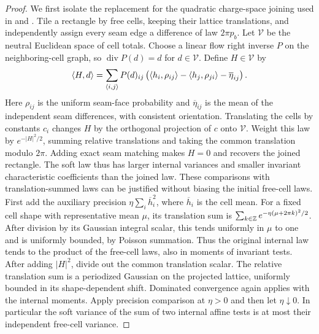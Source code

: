 \begin{proof}
We first isolate the replacement for the quadratic charge-space
joining used in  and
. Tile a rectangle by free cells,
keeping their lattice translations, and independently assign every
seam edge a difference of law \(2\pi p_b\).
Let \(\mathcal V\) be the neutral Euclidean space of cell totals.
Choose a linear flow right inverse \(P\) on the neighboring-cell
graph, so \(\operatorname{div}P(d)=d\) for \(d\in\mathcal V\).
Define \(H\in\mathcal V\) by
\begin{equation}
 \langle H,d\rangle
 =\sum_{\langle i,j\rangle}P(d)_{ij}
   \left(\langle h_i,\rho_{ij}\rangle-\langle h_j,\rho_{ji}\rangle
                            -\overline\eta_{ij}\right).
 \label{eq:soft-mismatch}
\end{equation}
Here \(\rho_{ij}\) is the uniform seam-face probability and
\(\overline\eta_{ij}\) is the mean of the independent seam
differences, with consistent orientation. Translating the cells
by constants \(c_i\) changes \(H\) by the orthogonal projection
of \(c\) onto \(\mathcal V\).
Weight this law by \(e^{-|H|^2/2}\), summing relative translations
and taking the common translation modulo \(2\pi\).
Adding exact seam matching makes \(H=0\) and recovers the joined
rectangle. The soft law thus has larger internal variances and
smaller invariant characteristic coefficients than the joined law.
These comparisons with translation-summed laws can be justified
without biasing the initial free-cell laws. First add the auxiliary
precision \(\eta\sum_i\overline h_i^2\), where \(\overline h_i\)
is the cell mean. For a fixed cell shape with representative mean
\(\mu\), its translation sum is
\(\sum_{k\in\mathbb Z}e^{-\eta(\mu+2\pi k)^2/2}\).
After division by its Gaussian integral scalar, this tends
uniformly in \(\mu\) to one and is uniformly bounded, by Poisson
summation. Thus the original internal law tends to the product
of the free-cell laws, also in moments of invariant tests.
After adding \(|H|^2\), divide out the common translation scalar.
The relative translation sum is a periodized Gaussian on the
projected lattice, uniformly bounded in its shape-dependent
shift. Dominated convergence again applies with the internal
moments. Apply precision comparison at \(\eta>0\) and then let
\(\eta\downarrow0\). In particular the soft variance of the sum
of two internal affine tests is at most their independent
free-cell variance.


\end{proof}
